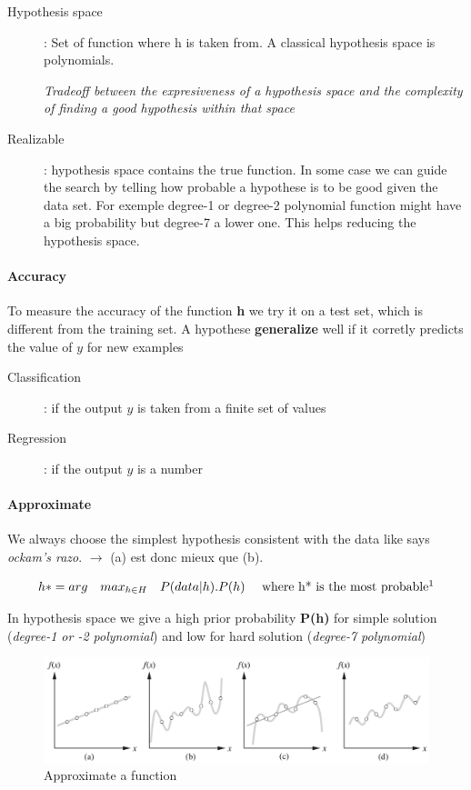\begin{description}
    \item[Hypothesis space] : Set of function where h is taken from. A classical 
        hypothesis space is polynomials.

        \textit{Tradeoff between the expresiveness of a hypothesis space and the
        complexity of finding a good hypothesis within that space}
    \item[Realizable] : hypothesis space contains the true function.
    In some case we can guide the search by telling how probable a hypothese is to be good given the data set. For exemple degree-1 or degree-2 polynomial function might have a big probability but degree-7 a lower one. This helps reducing the hypothesis space.
 \end{description}

\paragraph{Accuracy} To measure the accuracy of the function \textbf{h} we try it on a test set, which is different from the training set.
A hypothese \textbf{generalize} well if it corretly predicts the value of $y$ for new examples

\begin{description}
    \item[Classification] : if the output $y$ is taken from a finite set of values
    \item[Regression] : if the output $y$ is a number
\end{description}

\paragraph{Approximate} We always choose the simplest hypothesis consistent with the data
like says \textit{ockam's razo}. $\to$ (a) est donc mieux que (b).

$$ h* = arg \quad max_{h \in H} \quad P(data|h) . P(h)  \quad \textrm{ where h* is the most probable}\footnotemark$$

In  hypothesis  space  we  give  a high  prior  probability \textbf{P(h)}  for  simple
solution (\textit{degree-1 or -2 polynomial})  and low for hard solution
(\textit{degree-7 polynomial})

\begin{figure}[h]
    \centering
    \includegraphics[width=14cm]{razor.png}
    \caption{Approximate a function}
\end{figure}

